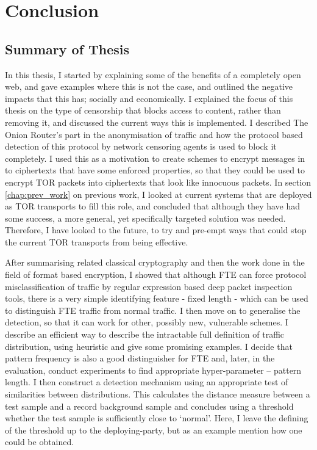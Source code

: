 \documentclass[ %
                    author={Samuel Russell},
                supervisor={Prof. Bogdan Warinschi},
                    degree={MEng},
                     title={Innocuous Ciphertexts},
                  subtitle={The DE-CENSOR Scheme},
                      type={research},
                      year={2018} ]{dissertation}
\begin{document}

\chapter{Conclusion}
\label{chap:conclusion}

\section{Summary of Thesis}

In this thesis, I started by explaining some of the benefits of a completely open web, and gave examples where this is not the case, and outlined the negative impacts that this has; socially and economically.
I explained the focus of this thesis on the type of censorship that blocks access to content, rather than removing it, and discussed the current ways this is implemented.
I described The Onion Router's part in the anonymisation of traffic and how the protocol based detection of this protocol by network censoring agents is used to block it completely.
I used this as a motivation to create schemes to encrypt messages in to ciphertexts that have some enforced properties, so that they could be used to encrypt TOR packets into ciphertexts that look like innocuous packets.
In section \ref{chap:prev_work} on previous work, I looked at current systems that are deployed as TOR transports to fill this role, and concluded that although they have had some success, a more general, yet specifically targeted solution was needed.
Therefore, I have looked to the future, to try and pre-empt ways that could stop the current TOR transports from being effective.

After summarising related classical cryptography and then the work done in the field of format based encryption, I showed that although FTE can force protocol misclassification of traffic by regular expression based deep packet inspection tools, there is a very simple identifying feature - fixed length - which can be used to distinguish FTE traffic from normal traffic.
I then move on to generalise the detection, so that it can work for other, possibly new, vulnerable schemes.
I describe an efficient way to describe the intractable full definition of traffic distribution, using heuristic and give some promising examples.
I decide that pattern frequency is also a good distinguisher for FTE and, later, in the evaluation, conduct experiments to find appropriate hyper-parameter -- pattern length.
I then construct a detection mechanism using an appropriate test of similarities between distributions.
This calculates the distance measure between a test sample and a record background sample and concludes using a threshold whether the test sample is sufficiently close to `normal'.
Here, I leave the defining of the threshold up to the deploying-party, but as an example mention how one could be obtained.
\end{document}
